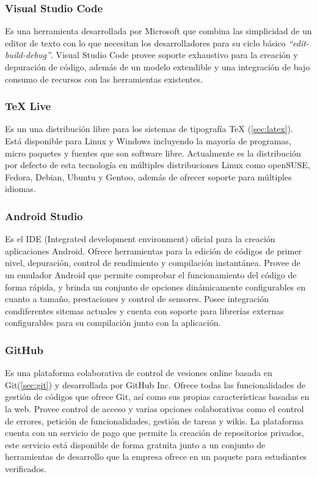\documentclass[12pt, twoside]{article}
\begin{document}
        \subsubsection{Visual Studio Code}
            Es una herramienta desarrollada por Microsoft que combina las simplicidad de un editor de texto con lo que necesitan los desarrolladores para su ciclo básico \textit{``edit-build-debug''}. Visual Studio Code provee soporte exhaustivo para la creación y depuración de código, además de un modelo extendible y una integración de bajo consumo de recursos con las herramientas existentes.

        \subsubsection{TeX Live}
            Es un una distribución libre para los sistemas de tipografía TeX (\ref{sec:latex}). Está disponible para Linux y Windows incluyendo la mayoría de programas, micro paquetes y fuentes que son software libre. Actualmente es la distribución por defecto de esta tecnología en múltiples distribuciones Linux como openSUSE, Fedora, Debian, Ubuntu y Gentoo, además de ofrecer soporte para múltiples idiomas.

        \subsubsection{Android Studio}
            Es el IDE (Integrated development environment) oficial para la creación aplicaciones Android. Ofrece herramientas para la edición de códigos de primer nivel, depuración, control de rendimiento y compilación instantánea. Provee de un emulador Android que permite comprobar el funcionamiento del código de forma rápida, y brinda un conjunto de opciones dinámicamente configurables en cuanto a tamaño, prestaciones y control de sensores. Posee integración condiferentes sitemas actuales y cuenta con soporte para librerías externas configurables para su compilación junto con la aplicación.

        \subsubsection{GitHub}
            Es una plataforma colaborativa de control de vesiones online basada en Git(\ref{sec:git}) y desarrollada por GitHub Inc. Ofrece todas las funcionalidades de gestión de códigos que ofrece Git, así como sus propias características basadas en la web. Provee control de acceso y varias opciones colaborativas como el control de errores, petición de funcionalidades, gestión de tareas y wikis. La plataforma cuenta con un servicio de pago que permite la creación de repositorios privados, este servicio está disponible de forma gratuita junto a un conjunto de herramientas de desarrollo que la empresa ofrece en un paquete para estudiantes verificados.
\end{document}
